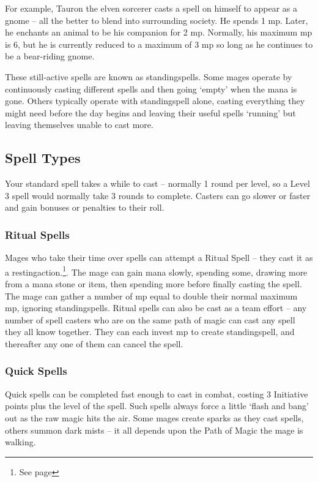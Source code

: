 \begin{multicols}{2}
For example, Tauron the elven sorcerer casts a spell on himself to appear as a gnome -- all the better to blend into surrounding society. He spends 1 \gls{mp}. Later, he enchants an animal to be his companion for 2 \gls{mp}. Normally, his maximum \gls{mp} is 6, but he is currently reduced to a maximum of 3 \gls{mp} so long as he continues to be a bear-riding gnome.

These still-active spells are known as \glspl{standingspell}. Some mages operate by continuously casting different spells and then going `empty' when the mana is gone. Others typically operate with \gls{standingspell} alone, casting everything they might need before the day begins and leaving their useful spells `running' but leaving themselves unable to cast more.

\subsection{Spell Types}

Your standard spell takes a while to cast -- normally 1 \gls{round} per level, so a Level 3 spell would normally take 3 \glspl{round} to complete.  Casters can go slower or faster and gain bonuses or penalties to their roll.

\subsubsection{Ritual Spells}

Mages who take their time over spells can attempt a Ritual Spell -- they cast it as a \gls{restingaction}.\footnote{See page \pageref{restingactions}}.
The mage can gain mana slowly, spending some, drawing more from a mana stone or item, then spending more before finally casting the spell.
The mage can gather a number of \gls{mp} equal to double their normal maximum \gls{mp}, ignoring \glspl{standingspell}.
Ritual spells can also be cast as a team effort -- any number of spell casters who are on the same \gls{path} of magic can cast any spell they all know together.
They can each invest \gls{mp} to create \gls{standingspell}, and thereafter any one of them can cancel the spell.

\subsubsection{Quick Spells}

Quick spells can be completed fast enough to cast in combat, costing 3 Initiative points plus the level of the spell.
Such spells always force a little `flash and bang' out as the raw magic hits the air.
Some mages create sparks as they cast spells, others summon dark mists -- it all depends upon the Path of Magic the mage is walking.


\end{multicols}
